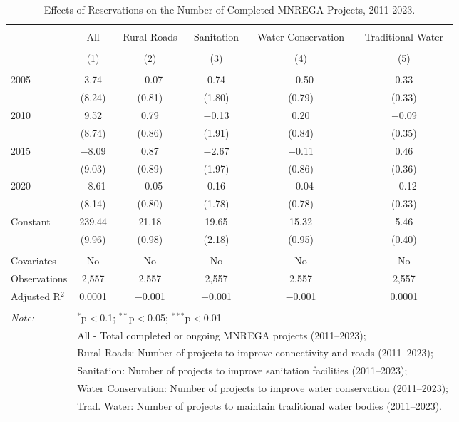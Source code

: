 
\begin{table}[!htbp] \centering 
  \caption{Effects of Reservations on the Number of Completed MNREGA Projects, 2011-2023.} 
  \label{main_mnrega_2011_2023_additive} 
\scriptsize 
\begin{tabular}{@{\extracolsep{0pt}}lccccc} 
\\[-1.8ex]\hline 
\hline \\[-1.8ex] 
 & All & Rural Roads & Sanitation & Water Conservation & Traditional Water \\ 
\\[-1.8ex] & (1) & (2) & (3) & (4) & (5)\\ 
\hline \\[-1.8ex] 
 2005 & 3.74 & $-$0.07 & 0.74 & $-$0.50 & 0.33 \\ 
  & (8.24) & (0.81) & (1.80) & (0.79) & (0.33) \\ 
  2010 & 9.52 & 0.79 & $-$0.13 & 0.20 & $-$0.09 \\ 
  & (8.74) & (0.86) & (1.91) & (0.84) & (0.35) \\ 
  2015 & $-$8.09 & 0.87 & $-$2.67 & $-$0.11 & 0.46 \\ 
  & (9.03) & (0.89) & (1.97) & (0.86) & (0.36) \\ 
  2020 & $-$8.61 & $-$0.05 & 0.16 & $-$0.04 & $-$0.12 \\ 
  & (8.14) & (0.80) & (1.78) & (0.78) & (0.33) \\ 
  Constant & 239.44 & 21.18 & 19.65 & 15.32 & 5.46 \\ 
  & (9.96) & (0.98) & (2.18) & (0.95) & (0.40) \\ 
 \hline \\[-1.8ex] 
Covariates & No & No & No & No & No \\ 
Observations & 2,557 & 2,557 & 2,557 & 2,557 & 2,557 \\ 
Adjusted R$^{2}$ & 0.0001 & $-$0.001 & $-$0.001 & $-$0.001 & 0.0001 \\ 
\hline 
\hline \\[-1.8ex] 
\textit{Note:}  & \multicolumn{5}{l}{$^{*}$p$<$0.1; $^{**}$p$<$0.05; $^{***}$p$<$0.01} \\ 
 & \multicolumn{5}{l}{All - Total completed or ongoing MNREGA projects (2011--2023);} \\ 
 & \multicolumn{5}{l}{Rural Roads: Number of projects to improve connectivity and roads (2011--2023);} \\ 
 & \multicolumn{5}{l}{Sanitation:  Number of projects to improve sanitation facilities  (2011--2023);} \\ 
 & \multicolumn{5}{l}{Water Conservation: Number of projects to improve water conservation (2011--2023);} \\ 
 & \multicolumn{5}{l}{Trad. Water: Number of projects to maintain traditional water bodies (2011--2023).} \\ 
\end{tabular} 
\end{table} 
